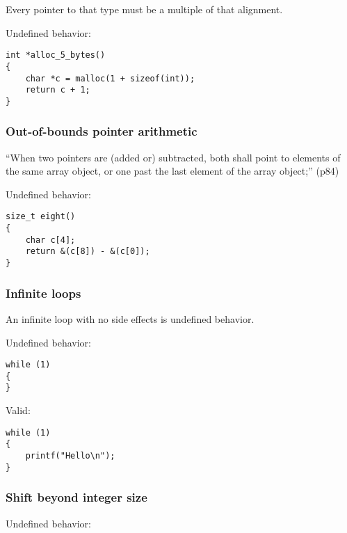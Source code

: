 \documentclass[12pt]{article}
\begin{document}
Every pointer to that type must be a multiple of that alignment. 

Undefined behavior:

\begin{verbatim}
int *alloc_5_bytes()
{
    char *c = malloc(1 + sizeof(int));
    return c + 1;
}
\end{verbatim}

\subsubsection{Out-of-bounds pointer arithmetic}

“When two pointers are (added or) subtracted, 
both shall point to elements of the same array object, 
or one past the last element of the array object;” (p84)

Undefined behavior:

\begin{verbatim}
size_t eight()
{
    char c[4];
    return &(c[8]) - &(c[0]);
}
\end{verbatim}

\subsubsection{Infinite loops}

An infinite loop with no side effects is undefined behavior.

Undefined behavior:

\begin{verbatim}
while (1)
{
}
\end{verbatim}

Valid:

\begin{verbatim}
while (1)
{
    printf("Hello\n");
}
\end{verbatim}

\subsubsection{Shift beyond integer size}

Undefined behavior:
\end{document}
